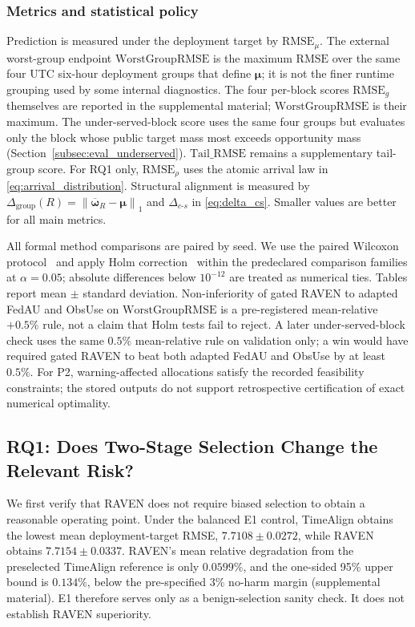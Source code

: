 \documentclass[letterpaper,journal]{IEEEtran}
\begin{document}
\subsubsection{Metrics and statistical policy}

Prediction is measured under the deployment target by
$\mathrm{RMSE}_{\mu}$.  The external worst-group endpoint
$\mathrm{WorstGroupRMSE}$ is the maximum $\mathrm{RMSE}$ over the same
four UTC six-hour deployment groups that define $\boldsymbol\mu$; it is
not the finer runtime grouping used by some internal diagnostics.
The four per-block scores $\mathrm{RMSE}_g$ themselves are reported in
the supplemental material; $\mathrm{WorstGroupRMSE}$ is their maximum.
The under-served-block score uses the same four groups but evaluates
only the block whose public target mass most exceeds opportunity mass
(Section~\ref{subsec:eval_underserved}).
$\mathrm{Tail\_RMSE}$ remains a supplementary tail-group score.
For RQ1 only, $\mathrm{RMSE}_{\rho}$ uses
the atomic arrival law in \eqref{eq:arrival_distribution}.  Structural
alignment is measured by
$\Delta_{\mathrm{group}}(R)=\left\|\overline{\boldsymbol\omega}_R-\boldsymbol\mu\right\|_1$
and $\Delta_{c\text{-}s}$ in \eqref{eq:delta_cs}.  Smaller values are
better for all main metrics.

All formal method comparisons are paired by seed.  We use the paired
Wilcoxon protocol~\cite{wilcoxon1945individual} and apply Holm
correction~\cite{holm1979simple} within the predeclared comparison
families at $\alpha=0.05$; absolute differences below
$10^{-12}$ are treated as numerical ties.  Tables report
mean $\pm$ standard deviation.  Non-inferiority of gated RAVEN to
adapted FedAU and ObsUse on $\mathrm{WorstGroupRMSE}$ is a
pre-registered mean-relative $+0.5\%$ rule, not a claim that Holm
tests fail to reject.  A later under-served-block check uses the same
$0.5\%$ mean-relative rule on validation only; a win would have required
gated RAVEN to beat both adapted FedAU and ObsUse by at least $0.5\%$.
For P2, warning-affected allocations satisfy
the recorded feasibility constraints; the stored outputs do not
support retrospective certification of exact numerical optimality.

\subsection{RQ1: Does Two-Stage Selection Change the Relevant Risk?}
\label{subsec:eval_rq1}

We first verify that RAVEN does not require biased selection to obtain a
reasonable operating point.  Under the balanced E1 control, TimeAlign obtains
the lowest mean deployment-target RMSE, $7.7108\pm0.0272$, while RAVEN obtains
$7.7154\pm0.0337$.  RAVEN's mean relative degradation from the preselected
TimeAlign reference is only $0.0599\%$, and the one-sided 95\% upper bound is
$0.134\%$, below the pre-specified 3\% no-harm margin
(supplemental material).  E1 therefore
serves only as a benign-selection sanity check.  It does not establish
RAVEN superiority.
\end{document}
